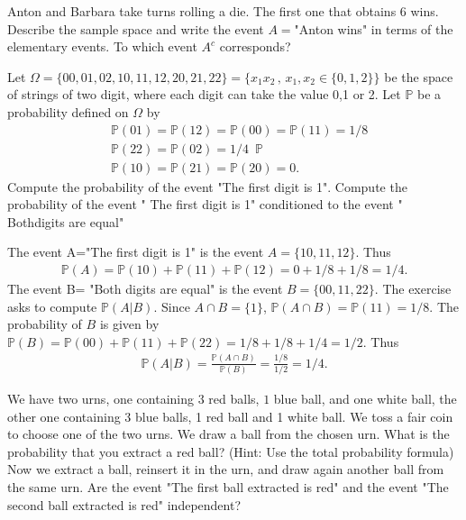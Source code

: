 \documentclass[12pt]{article}
\newcommand{\<}{{\langle \!\! \langle}}
\renewcommand{\>}{{\rangle \!\! \rangle}}
\newcommand{\bel}[2]{\begin{equation} \label{#1} \begin{split} #2
 					\end{split} \end{equation}}
\begin{document}
\begin{ExerciseList}


	\Exercise Anton and Barbara take turns rolling a die. The first one that obtains 6 wins. Describe the sample space and write the event $A=$"Anton wins" in terms of the elementary events. To which event $A^c$ corresponds? 

	\Exercise Let $\Omega = \{00,01,02,10,11,12,20,21,22\}= \{x_1x_2\,,\,x_1,x_2\in\{0,1,2\}\}$ be the space of strings of two digit, where each digit can take the value 0,1 or 2. Let $\mathbb{P}$ be a probability defined on $\Omega$ by 
	\bel{}{ & \mathbb{P}(01) = \mathbb{P}(12) = \mathbb{P}(00)=\mathbb{P}(11) = 1/8 \\
		 & \mathbb{P}(22)= \mathbb{P}(02) = 1/4\,\,\,\mathbb{P}\\
		 & \mathbb{P}(10) = \mathbb{P}(21)= \mathbb{P}(20) = 0.}
		 \Question Compute the probability of the event "The first digit is 1".
		 \Question Compute the probability of the event " The first digit is 1" conditioned to the event " Bothdigits are equal"

		 \Answer 
		 \Question The event A="The first digit is 1" is the event $A=\{10,11,12\}$. Thus 
		 \bel{}{\mathbb{P}(A)= \mathbb{P}(10)+\mathbb{P}(11)+\mathbb{P}(12)=0+1/8+1/8 = 1/4.}
		 \Question The event B= "Both digits are equal" is the event $B = \{00,11,22\}$. The exercise asks to compute $\mathbb{P}(A|B)$. Since $A\cap B = \{1\}$, $\mathbb{P}(A\cap B) = \mathbb{P}(11)= 1/8$. The probability of $B$ is given by $\mathbb{P}(B) = \mathbb{P}(00)+\mathbb{P}(11)+\mathbb{P}(22) = 1/8+ 1/8+1/4= 1/2 $. Thus 
		 \bel{}{\mathbb{P}(A|B) =\frac{ \mathbb{P}(A\cap B)}{\mathbb{P}(B)} = \frac{1/8}{1/2}= 1/4.}


	\Exercise We have two urns, one containing $3$ red balls, $1$ blue ball, and one white ball, the other one containing 3 blue balls, 1 red ball and 1 white ball. We toss a fair coin to choose one of the two urns. 
    \Question We draw a ball from the chosen urn. What is the probability that you extract a red ball? (Hint: Use the total probability formula)
    \Question Now we extract a ball, reinsert it in the urn, and draw again another ball from the same urn. Are the event "The first ball extracted is red" and the event "The second  ball  extracted is red" independent? 



\end{ExerciseList}
\end{document}
